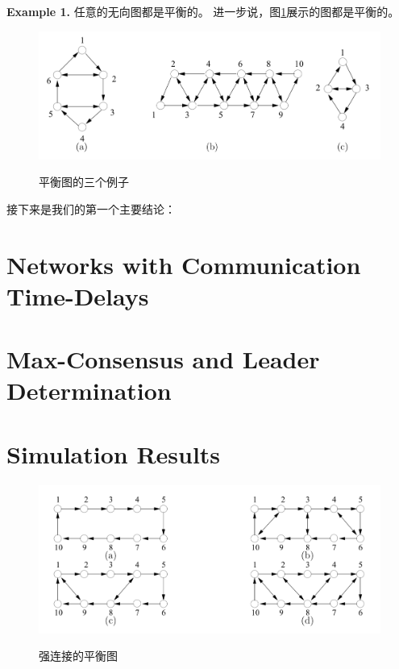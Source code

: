 \documentclass{article}
\begin{document}
\textbf{Example 1.} 任意的无向图都是平衡的。
进一步说，图\ref{BalancedGraphs}展示的图都是平衡的。
\begin{figure}[htbp]
    \centering
    \includegraphics[width=12cm]{figures/Fig3-BalancedGraphs.jpeg}
    \label{BalancedGraphs}
    \caption{平衡图的三个例子}
\end{figure}

接下来是我们的第一个主要结论：







\section{Networks with Communication Time-Delays}



\section{Max-Consensus and Leader Determination}



\section{Simulation Results}
\begin{figure}[htbp]
    \centering
    \includegraphics[width=12cm]{figures/Fig4-BalancedSC.jpeg}
    \label{BalancedSC}
    \caption{强连接的平衡图}
\end{figure}
\end{document}

